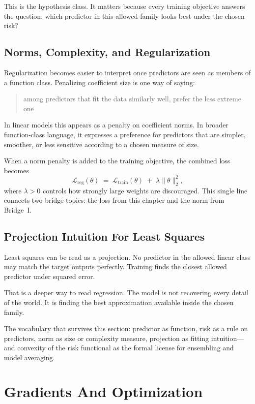 This is the hypothesis class. It matters because every training objective answers the question: which predictor in this allowed family looks best under the chosen risk?

\subsection*{Norms, Complexity, and Regularization}

Regularization becomes easier to interpret once predictors are seen as members of a function class. Penalizing coefficient size is one way of saying:

\begin{quote}
among predictors that fit the data similarly well, prefer the less extreme one
\end{quote}

In linear models this appears as a penalty on coefficient norms. In broader function-class language, it expresses a preference for predictors that are simpler, smoother, or less sensitive according to a chosen measure of size.

When a norm penalty is added to the training objective, the combined loss becomes
\[
\mathcal{L}_{\text{reg}}(\theta) \;=\; \mathcal{L}_{\text{train}}(\theta) \;+\; \lambda \|\theta\|_2^2,
\]
where $\lambda > 0$ controls how strongly large weights are discouraged. This single line connects two bridge topics: the loss from this chapter and the norm from Bridge~I.

\subsection*{Projection Intuition For Least Squares}

Least squares can be read as a projection. No predictor in the allowed linear class may match the target outputs perfectly. Training finds the closest allowed predictor under squared error.

That is a deeper way to read regression. The model is not recovering every detail of the world. It is finding the best approximation available inside the chosen family.

The vocabulary that survives this section: predictor as function, risk as a rule on predictors, norm as size or complexity measure, projection as fitting intuition---and convexity of the risk functional as the formal license for ensembling and model averaging.

\section*{Gradients And Optimization}

